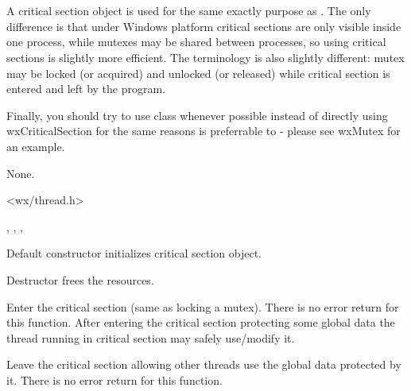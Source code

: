 \section{}\label{wxcriticalsection}

A critical section object is used for the same exactly purpose as 
. The only difference is that under Windows platform
critical sections are only visible inside one process, while mutexes may be
shared between processes, so using critical sections is slightly more
efficient. The terminology is also slightly different: mutex may be locked (or
acquired) and unlocked (or released) while critical section is entered and left
by the program.

Finally, you should try to use 
 class whenever
possible instead of directly using wxCriticalSection for the same reasons 
 is preferrable to 
 - please see wxMutex for an example.


None.


<wx/thread.h>


, , 
, 


\label{wxcriticalsectionctor}


Default constructor initializes critical section object.

\label{wxcriticalsectiondtor}


Destructor frees the resources.

\label{wxcriticalsectionenter}


Enter the critical section (same as locking a mutex). There is no error return
for this function. After entering the critical section protecting some global
data the thread running in critical section may safely use/modify it.

\label{wxcriticalsectionleave}


Leave the critical section allowing other threads use the global data protected
by it. There is no error return for this function.

